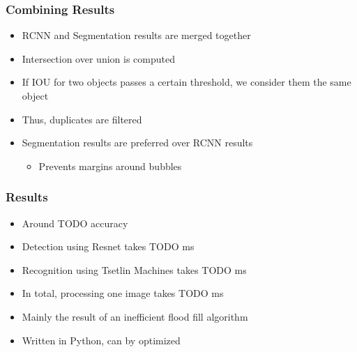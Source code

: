 \documentclass{beamer}
\begin{document}
\begin{frame}
    \frametitle{Combining Results}

    \begin{itemize}
        \item RCNN and Segmentation results are merged together
        \item Intersection over union is computed
        \item If IOU for two objects passes a certain threshold, we consider them the same object
        \item Thus, duplicates are filtered
        \item Segmentation results are preferred over RCNN results
        \begin{itemize}
            \item Prevents margins around bubbles
        \end{itemize}
    \end{itemize}

\end{frame}

\begin{frame}
    \frametitle{Results}

    \begin{itemize}
        \item Around TODO accuracy
        \item Detection using Resnet takes TODO ms
        \item Recognition using Tsetlin Machines takes TODO ms
        \item In total, processing one image takes TODO ms
        \item Mainly the result of an inefficient flood fill algorithm
        \item Written in Python, can by optimized
    \end{itemize}

\end{frame}
\end{document}

